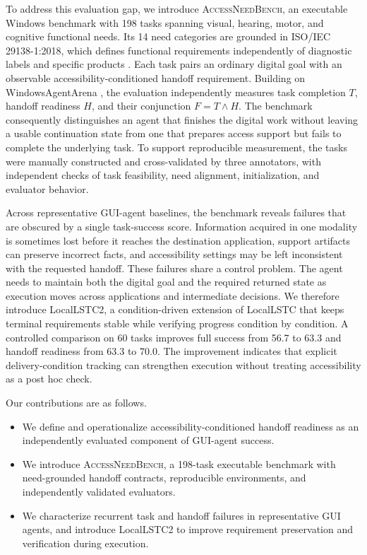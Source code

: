 \documentclass[11pt]{article}
\newcommand{\bench}{\textsc{AccessNeedBench}\xspace}
\begin{document}
To address this evaluation gap, we introduce \bench, an executable Windows benchmark with 198 tasks spanning visual, hearing, motor, and cognitive functional needs. Its 14 need categories are grounded in ISO/IEC 29138-1:2018, which defines functional requirements independently of diagnostic labels and specific products \citep{iso29138}. Each task pairs an ordinary digital goal with an observable accessibility-conditioned handoff requirement. Building on WindowsAgentArena \citep{waa}, the evaluation independently measures task completion $T$, handoff readiness $H$, and their conjunction $F=T\land H$. The benchmark consequently distinguishes an agent that finishes the digital work without leaving a usable continuation state from one that prepares access support but fails to complete the underlying task. To support reproducible measurement, the tasks were manually constructed and cross-validated by three annotators, with independent checks of task feasibility, need alignment, initialization, and evaluator behavior.

Across representative GUI-agent baselines, the benchmark reveals failures that are obscured by a single task-success score. Information acquired in one modality is sometimes lost before it reaches the destination application, support artifacts can preserve incorrect facts, and accessibility settings may be left inconsistent with the requested handoff. These failures share a control problem. The agent needs to maintain both the digital goal and the required returned state as execution moves across applications and intermediate decisions. We therefore introduce LocalLSTC2, a condition-driven extension of LocalLSTC \citep{locallstc} that keeps terminal requirements stable while verifying progress condition by condition. A controlled comparison on 60 tasks improves full success from 56.7 to 63.3 and handoff readiness from 63.3 to 70.0. The improvement indicates that explicit delivery-condition tracking can strengthen execution without treating accessibility as a post hoc check.

Our contributions are as follows.
\begin{itemize}[leftmargin=*,nosep]
\item We define and operationalize accessibility-conditioned handoff readiness as an independently evaluated component of GUI-agent success.
\item We introduce \bench, a 198-task executable benchmark with need-grounded handoff contracts, reproducible environments, and independently validated evaluators.
\item We characterize recurrent task and handoff failures in representative GUI agents, and introduce LocalLSTC2 to improve requirement preservation and verification during execution.
\end{itemize}
\end{document}
